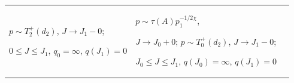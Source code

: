 \begin{center}
\begin{tabular}{|p{2.6cm}|p{6.5cm}|p{6.5cm}|}
{$p\sim T^+_2(d_2)$, $J\to J_1-0$; 


$0\le J\le J_1$, $q_0=\infty$, $q(J_1)=0$} & 


\parbox{6.5cm}{$p\sim\tau(A)p_1^{-1/2\chi}$, 


$J\to J_0+0$; $p\sim T^+_0(d_2)$, $J\to J_1-0$; 


$J_0\le J\le J_1$, $q(J_0)=\infty$, $q(J_1)=0$}\\ 


\hline 


$\mu=\mu_2$ & 


\parbox{6.5cm}{$p\sim J_0J^{-1/2\chi}$, $J\to0$; 


$p\sim V^-_2$, $J\to J_1-0$; $0\le J\le J_1$, 


$q_0=\infty$, $q(J_1)=0$} & 


\parbox{6.5cm}{$p\sim\tau(A)p_1^{-1/2\chi}$, 


$J\to J_0+0$; $p\sim V^+_0$, $J\to J_1-0$; 


$J_0\le J\le J_1$, $q(J_0)=\infty$, $q(J_1)=0$} \\ 


\hline 


$\mu>\mu_2$ & 


\parbox{6.5cm}{$p{\sim} L(d_1)$, $J\to0$; 


$p{\sim} J_0J^{k_1+\sigma}$, $J\to\infty$; 


$0\le J<\infty$, $q_0=0$, $q(\infty)=\theta_0(\mu)$} & 


\parbox{6.5cm}{$p\sim K(D)$, $J\to0$; $p\sim J_0J^{k_1+\sigma}$,\\ 


$J\to\infty$; $0\le J<\infty$, $q_0=D p^{-\varphi}_0>0$, \\


$q(\infty)=\theta_0(\mu)$}\\ 


\hline 


\ & \\ 


\hline 


$\mu<\mu_2$ & 


 \\ 


\hline 



\end{tabular}
\end{center}
